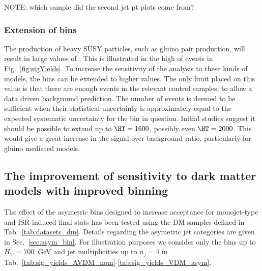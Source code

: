 NOTE: which sample did the second jet pt plots come from?

\subsubsection{Extension of \HT bins}

The production of heavy SUSY particles, such as gluino pair
production, will result in large values of \HT . This is illustrated in the high 
\HT of events in Fig.~\ref{fig:sigYields}. To increase the sensitivity
of the analysis to these kinds of models, the \HT bins can be extended to higher
values. The only limit placed on this value is that there are enough events in the
relevant control samples, to allow a data driven background prediction. The
number of events is deemed to be sufficient when their statistical uncertainty is
approximately equal to the expected systematic uncertainty for the bin in
question. Initial studies suggest it should be possible to extend up to
$\HT=1600$, possibly even $\HT=2000$. This would give a great increase in the
signal over background ratio, particularly for gluino mediated models.

\clearpage
\subsection{The improvement of sensitivity to dark matter models with improved binning }

The effect of the asymetric bins designed to increase acceptance for monojet-type and ISR induced final stats has been tested using the DM samples defined in Tab.~\ref{tab:datasets_dm}. Details regarding the asymetric jet categories are given in Sec.~\ref{sec:asym_bin}.
For illustration purposes we consider only the bins up to $H_\textrm{T}=700$~GeV and jet multiplicities up to $n_j=4$ in Tab.~\ref{tab:sig_yields_AVDM_nom}-\ref{tab:sig_yields_VDM_asym}.

